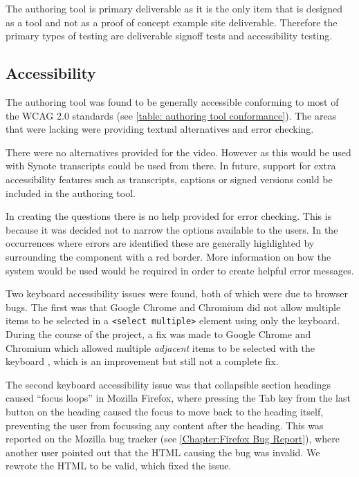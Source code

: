 The authoring tool is primary deliverable as it is the only item that is designed as a tool and not as a proof of concept example site deliverable. Therefore the primary types of testing are deliverable signoff tests and accessibility testing.

\subsection{Accessibility}
\label{Section:Testing_Authoring_tool_accessibility}

The authoring tool was found to be generally accessible conforming to most of the \gls{WCAG} 2.0 standards (see \autoref{table: authoring tool conformance}). The areas that were lacking were providing textual alternatives and error checking.

There were no alternatives provided for the video. However as this would be used with Synote transcripts could be used from there. In future, support for extra accessibility features such as transcripts, captions or signed versions could be included in the authoring tool.

In creating the questions there is no help provided for error checking. This is because it was decided not to narrow the options available to the users. In the occurrences where errors are identified these are generally highlighted by surrounding the component with a red border. More information on how the system would be used would be required in order to create helpful error messages.

Two keyboard accessibility issues were found, both of which were due to browser bugs. The first was that Google Chrome and Chromium did not allow multiple items to be selected in a \texttt{\textless select multiple\textgreater} element using only the keyboard. During the course of the project, a fix was made to Google Chrome and Chromium which allowed multiple \textit{adjacent} items to be selected with the keyboard \citep{ChromiumMultipleSelectBug}, which is an improvement but still not a complete fix.

The second keyboard accessibility issue was that collapsible section headings caused ``focus loops'' in Mozilla Firefox, where pressing the Tab key from the last button on the heading caused the focus to move back to the heading itself, preventing the user from focussing any content after the heading. This was reported on the Mozilla bug tracker \citep{FirefoxFocusLoopBug} (see \autoref{Chapter:Firefox Bug Report}), where another user pointed out that the HTML causing the bug was invalid. We rewrote the HTML to be valid, which fixed the issue.

